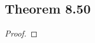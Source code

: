 \documentclass[../../main.tex]{subfiles}
\begin{document}
\subsection{Theorem 8.50}
\begin{wts}

\end{wts}
\begin{proof}

\end{proof}
\end{document}

